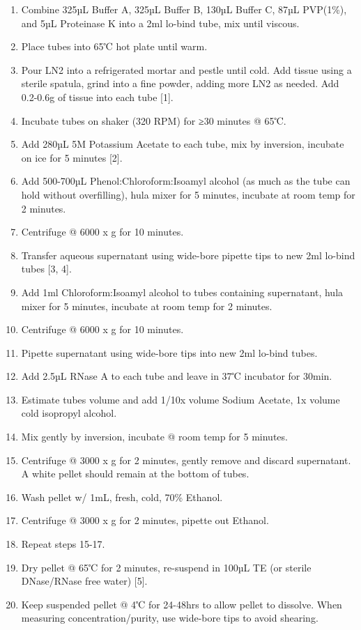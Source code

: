 \documentclass[
]{book}
\begin{document}
\begin{enumerate}
\def\labelenumi{\arabic{enumi}.}
\item
  Combine 325µL Buffer A, 325µL Buffer B, 130µL Buffer C, 87µL PVP(1\%), and 5µL Proteinase K into a 2ml lo-bind tube, mix until viscous.
\item
  Place tubes into 65℃ hot plate until warm.
\item
  Pour LN2 into a refrigerated mortar and pestle until cold. Add tissue using a sterile spatula, grind into a fine powder, adding more LN2 as needed. Add 0.2-0.6g of tissue into each tube {[}1{]}.
\item
  Incubate tubes on shaker (320 RPM) for ≥30 minutes @ 65℃.
\item
  Add 280µL 5M Potassium Acetate to each tube, mix by inversion, incubate on ice for 5 minutes {[}2{]}.
\item
  Add 500-700µL Phenol:Chloroform:Isoamyl alcohol (as much as the tube can hold without overfilling), hula mixer for 5 minutes, incubate at room temp for 2 minutes.
\item
  Centrifuge @ 6000 x g for 10 minutes.
\item
  Transfer aqueous supernatant using wide-bore pipette tips to new 2ml lo-bind tubes {[}3, 4{]}.
\item
  Add 1ml Chloroform:Isoamyl alcohol to tubes containing supernatant, hula mixer for 5 minutes, incubate at room temp for 2 minutes.
\item
  Centrifuge @ 6000 x g for 10 minutes.
\item
  Pipette supernatant using wide-bore tips into new 2ml lo-bind tubes.
\item
  Add 2.5µL RNase A to each tube and leave in 37℃ incubator for 30min.
\item
  Estimate tubes volume and add 1/10x volume Sodium Acetate, 1x volume cold isopropyl alcohol.
\item
  Mix gently by inversion, incubate @ room temp for 5 minutes.
\item
  Centrifuge @ 3000 x g for 2 minutes, gently remove and discard supernatant. A white pellet should remain at the bottom of tubes.
\item
  Wash pellet w/ 1mL, fresh, cold, 70\% Ethanol.
\item
  Centrifuge @ 3000 x g for 2 minutes, pipette out Ethanol.
\item
  Repeat steps 15-17.
\item
  Dry pellet @ 65℃ for 2 minutes, re-suspend in 100µL TE (or sterile DNase/RNase free water) {[}5{]}.
\item
  Keep suspended pellet @ 4℃ for 24-48hrs to allow pellet to dissolve. When measuring concentration/purity, use wide-bore tips to avoid shearing.~
\end{enumerate}
\end{document}
